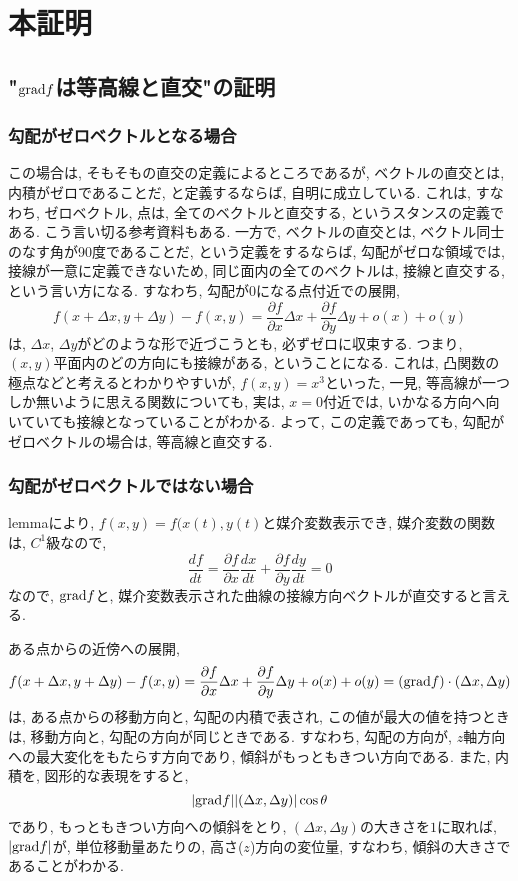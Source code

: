 \documentclass{jsarticle}
\newcommand*{\grad}{{\rm grad}}
\begin{document}
\section*{本証明}
\subsection*{"$\grad f$は等高線と直交"の証明}
\subsubsection*{勾配がゼロベクトルとなる場合}
この場合は, そもそもの直交の定義によるところであるが, ベクトルの直交とは, 内積がゼロであることだ, と定義するならば, 自明に成立している. これは, すなわち, ゼロベクトル, 点は, 全てのベクトルと直交する, というスタンスの定義である. こう言い切る参考資料もある. 
一方で, ベクトルの直交とは, ベクトル同士のなす角が90度であることだ, という定義をするならば, 勾配がゼロな領域では, 接線が一意に定義できないため, 同じ面内の全てのベクトルは, 接線と直交する, という言い方になる. 
すなわち, 勾配が0になる点付近での展開, 
\begin{equation}
  f(x + \Delta x, y + \Delta y) - f(x, y) = \frac{\partial f}{\partial x}\Delta x + \frac{\partial f}{\partial y}\Delta y + o(x) + o(y)
\end{equation}
は, $\Delta x$, $\Delta y$がどのような形で近づこうとも, 必ずゼロに収束する. つまり, $(x, y)$平面内のどの方向にも接線がある, ということになる. 
これは, 凸関数の極点などと考えるとわかりやすいが, $f(x, y) = x^3$といった, 一見, 等高線が一つしか無いように思える関数についても, 実は, $x = 0$付近では, いかなる方向へ向いていても接線となっていることがわかる. 
よって, この定義であっても, 勾配がゼロベクトルの場合は, 等高線と直交する. 
\subsubsection*{勾配がゼロベクトルではない場合}
lemmaにより, $f(x, y) = f(x(t), y(t)$と媒介変数表示でき, 媒介変数の関数は, $C^1$級なので, 
\begin{equation}
  \frac{df}{dt} = \frac{\partial f}{\partial x}\frac{dx}{dt} + \frac{\partial f}{\partial y}\frac{dy}{dt} = 0
\end{equation}
なので, $\grad f$と, 媒介変数表示された曲線の接線方向ベクトルが直交すると言える. 

ある点からの近傍への展開, 
\begin{equation}
  f(x + \Delta x, y + \Delta y) - f(x, y) = \frac{\partial f}{\partial x}\Delta x + \frac{\partial f}{\partial y}\Delta y + o(x) + o(y)
  = (\grad f)\cdot (\Delta x, \Delta y)
\end{equation}
は, ある点からの移動方向と, 勾配の内積で表され, この値が最大の値を持つときは, 移動方向と, 勾配の方向が同じときである. すなわち, 勾配の方向が, $z$軸方向への最大変化をもたらす方向であり, 傾斜がもっともきつい方向である. 
また, 内積を, 図形的な表現をすると, 
\[
  | \grad f ||(\Delta x, \Delta y)|\cos\theta
\]
であり, もっともきつい方向への傾斜をとり, $(\Delta x, \Delta y)$の大きさを$1$に取れば, $|\grad f|$が, 単位移動量あたりの, 高さ($z$)方向の変位量, すなわち, 傾斜の大きさであることがわかる. 
\end{document}
